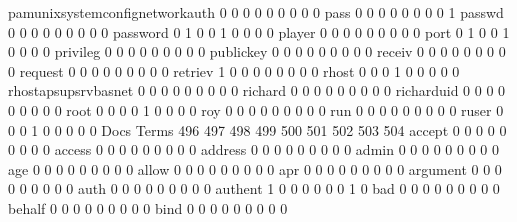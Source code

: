 \documentclass[compress,8pt]{beamer}
\begin{document}
\begin{frame}
\begin{Schunk}
  pamunixsystemconfignetworkauth             0   0   0   0   0   0   0   0   0
  pass                                       0   0   0   0   0   0   0   0   1
  passwd                                     0   0   0   0   0   0   0   0   0
  password                                   0   1   0   0   1   0   0   0   0
  player                                     0   0   0   0   0   0   0   0   0
  port                                       0   1   0   0   1   0   0   0   0
  privileg                                   0   0   0   0   0   0   0   0   0
  publickey                                  0   0   0   0   0   0   0   0   0
  receiv                                     0   0   0   0   0   0   0   0   0
  request                                    0   0   0   0   0   0   0   0   0
  retriev                                    1   0   0   0   0   0   0   0   0
  rhost                                      0   0   0   1   0   0   0   0   0
  rhostapsupsrvbasnet                        0   0   0   0   0   0   0   0   0
  richard                                    0   0   0   0   0   0   0   0   0
  richarduid                                 0   0   0   0   0   0   0   0   0
  root                                       0   0   0   0   1   0   0   0   0
  roy                                        0   0   0   0   0   0   0   0   0
  run                                        0   0   0   0   0   0   0   0   0
  ruser                                      0   0   0   1   0   0   0   0   0
                                          Docs
Terms                                      496 497 498 499 500 501 502 503 504
  accept                                     0   0   0   0   0   0   0   0   0
  access                                     0   0   0   0   0   0   0   0   0
  address                                    0   0   0   0   0   0   0   0   0
  admin                                      0   0   0   0   0   0   0   0   0
  age                                        0   0   0   0   0   0   0   0   0
  allow                                      0   0   0   0   0   0   0   0   0
  apr                                        0   0   0   0   0   0   0   0   0
  argument                                   0   0   0   0   0   0   0   0   0
  auth                                       0   0   0   0   0   0   0   0   0
  authent                                    1   0   0   0   0   0   0   1   0
  bad                                        0   0   0   0   0   0   0   0   0
  behalf                                     0   0   0   0   0   0   0   0   0
  bind                                       0   0   0   0   0   0   0   0   0

\end{Schunk}
\end{frame}
\end{document}
